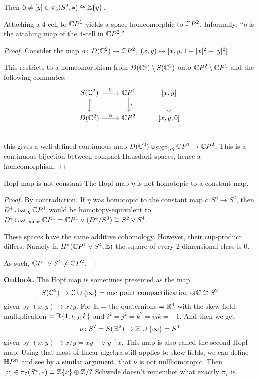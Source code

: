 \documentclass[language=english]{TemplateLecture}
\begin{document}
Then \(0 \neq [y] \in \pi_3(S^2, *) \cong \mathbb{Z}\{y\}\).

\begin{proposition}
    Attaching a \(4\)-cell to \(\mathbb{C} P^1\) yields a space homeomorphic to \(\mathbb{C} P ^2\). Informally: \enquote{\(\eta\) is the attahing map of the \(4\)-cell in \(\mathbb{C} P^2\).}
\end{proposition}

\begin{proof}
    Consider the map \(\alpha\colon D(\mathbb{C}^2) \to \mathbb{C} P^2\), \((x,y) \mapsto [x,y, 1- \lvert x\rvert ^2 - \lvert y\rvert^2]\).

    This restricts to a homeomorphism from \(D(\mathbb{C}^4) \setminus S(\mathbb{C}^2)\) onto \(\mathbb{C} P^2 \setminus \mathbb{C} P^1\) and the following commutes:
    \[\begin{tikzcd}
        S(\IC^2) \ar[d, hook] \ar[r, "\eta"] & \IC P^1 \ar[d, "i"] & {[x,y]} \ar[d]\\
        D(\IC^2) \ar[r, "\alpha"] & \IC P^2 & {[x,y,0] }\\
    \end{tikzcd}\]
    this gives a well-defined continuous map \(D(\mathbb{C}^2) \cup_{S(\mathbb{C}^2), \eta} \mathbb{C} P^1 \to \mathbb{C} P^2\), This is a continuous bijection between compact Hausdorff spaces, hence a homeomorphism.
\end{proof}

\begin{thm}{Hopf map is not constant}{}
    The Hopf map \(\eta\) is not homotopic to a constant map.
\end{thm}

\begin{proof}
    By contradiction. If \(\eta\) was homotopic to the constant map \(c\colon S^3 \to S^2\), then \(D^4 \cup_{S^3, \eta} \mathbb{C} P^1 \) would be homotopy-equivalent to \(D^4 \cup_{S^3, \text{const}} \mathbb{C} P^1 = \mathbb{C} P^1 \vee (D^4/S^3)  \cong S^2 \vee S^4\).

    These spaces have the same additive cohomology. However, their cup-product differs. Namely in \(H^*(\mathbb{C} P^1 \vee S^4, \mathbb{Z})\) the square of every 2-dimensional class is \(0\).

    As such,
    \(\mathbb{C} P^1 \vee S^4 \not\sim \mathbb{C} P^2\).
\end{proof}

\textbf{Outlook.} The Hopf map is sometimes presented as the map
\[S(\mathbb{C}^2) \to \mathbb{C} \cup \{\infty\} = \text{one point compactification of} \mathbb{C} \cong S^2\]
given by \((x,y) \mapsto x/y\). For \(\mathbb{H} =\) the quaternions \(= \mathbb{R}^4\) with the skew-field multiplication \(= \mathbb{R}\{1,i,j,k\}\) and \(i^2 = j^2 = k^2 = ijk = -1\). And then we get
\[\nu \colon S^7 = S(\mathbb{H}^2) \mapsto \mathbb{H} \cup \{\infty\} = S^4\]
given by \((x,y) \mapsto x/y = xy^{-1} \vee y^{-1}x\). This map is also called the second Hopf-map. Using that most of linear algebra still applies to skew-fields, we can define \(\mathbb{H} P^n\) and see by a similar argument, that \(\nu\) is not nullhomotopic. Then \([\nu] \in \pi_7(S^4, *) \cong \mathbb{Z}\{\nu\} \oplus \mathbb{Z}/?\)
Schwede doesn't remember what exactly \(\pi_7\) is.
\end{document}
